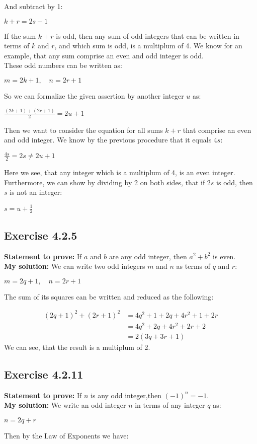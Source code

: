 \documentclass{article}
\newcommand{\cent}[1]{\begin{center}#1\end{center}}
\newcommand{\mAlign}[1]{\begin{align*}#1\end{align*}}
\newcommand{\Prove}{\textbf{Statement to prove: }}
\newcommand{\Solution}{\textbf{My solution: }}
\newcommand{\QED}{\boxed{}}
\newcommand{\Exercise}[1]{\subsection*{Exercise #1}}
\begin{document}
	And subtract by 1:
	
	\cent{$k+r=2s-1$}
	
	If the sum $k+r$ is odd, then any sum of odd integers that can be written in terms of $k$ and $r$, and which sum is odd, is a multiplum of 4. We know for an example, that any sum comprise an even and odd integer is odd.\\
	
	These odd numbers can be written as:
		
	\cent{$m = 2k+1, \quad n = 2r+1 $}
	
	So we can formalize the given assertion by another integer $u$ as:
	
	\cent{$\frac{(2k+1) + (2r+1)}{2} = 2u +1$}
	
	Then we want to consider the equation for all sums $k+r$ that comprise an even and odd integer. We know by the previous procedure that it equals $4s$:
	
	\cent{$\frac{4s}{2} = 2s \neq 2u +1$}
	
	Here we see, that any integer which is a multiplum of 4, is an even integer. Furthermore, we can show by dividing by 2 on both sides, that if $2s$ is odd, then $s$ is not an integer:
	
	\cent{$s=u+\frac{1}{2}$}
	
	\QED
	
	\Exercise{4.2.5}
	\Prove
	If $a$ and $b$ are any odd integer, then $a^2 + b^2$ is even.\\
	
	\Solution
	We can write two odd integers $m$ and $n$ as terms of $q$ and $r$:
	\cent{$m = 2q+1, \quad n = 2r+1$}
	
	The sum of its squares can be written and reduced as the following:
	
	\mAlign{(2q+1)^2 + (2r+1)^2 &= 4q^2 + 1 + 2q + 4r^2 + 1 +2r \\
					&= 4q^2+2q + 4r^2 + 2r +2 \\
					&= 2(3q +3r +1)}
	We can see, that the result is a multiplum of 2.\\
	\QED
	
	\Exercise{4.2.11}
	
	\Prove
	If $n$ is any odd integer,then $(-1)^n = -1$.\\
	
	\Solution
	We write an odd integer $n$ in terms of any integer $q$ as:
	
	\cent{$n = 2q+r$}
	
	Then by the Law of Exponents we have:
	
\end{document}
